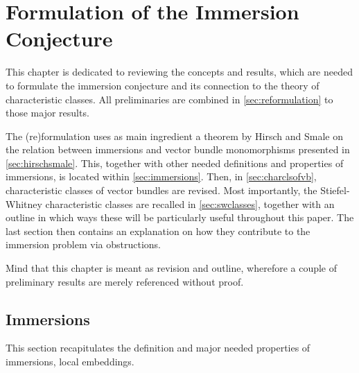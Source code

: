 % 

\chapter{Formulation of the Immersion Conjecture}
\label{chap:reformulation}
This chapter is dedicated to reviewing the concepts and results,
which are needed to formulate the immersion conjecture and its
connection to the theory of characteristic classes.
All preliminaries are combined in \autoref{sec:reformulation} to those
major results.

The (re)formulation uses as main ingredient a theorem by Hirsch
and Smale on the relation between immersions and vector bundle
monomorphisms presented in \autoref{sec:hirschsmale}.
This, together with other needed definitions and properties of
immersions, is located within \autoref{sec:immersions}.
Then, in \autoref{sec:charclsofvb}, characteristic classes of vector
bundles are revised. Most importantly, the Stiefel-Whitney
characteristic classes are recalled in \autoref{sec:swclasses},
together with an outline in which ways these will be particularly
useful throughout this paper.
The last section then contains an explanation on how they contribute
to the immersion problem via obstructions.

Mind that this chapter is meant as revision and outline, wherefore a
couple of preliminary results are merely referenced without proof.

\section{Immersions}\label{sec:immersions}
This section recapitulates the definition and major needed properties
of immersions, \idest local embeddings.

